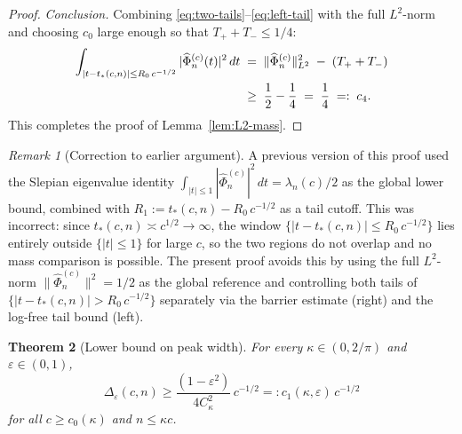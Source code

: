\documentclass[12pt,a4paper]{amsart}
\newtheorem{theorem}{Theorem}[section]
\theoremstyle{definition}
\theoremstyle{remark}
\newtheorem{remark}[theorem]{Remark}
\newcommand{\Phihat}{\widehat{\Phi}}
\newcommand{\tstar}{t_*(c,n)}
\begin{document}
\begin{proof}
\textit{Conclusion.}
Combining \eqref{eq:two-tails}--\eqref{eq:left-tail}
with the full $L^2$-norm and choosing $c_0$ large enough
so that $T_+ + T_- \le 1/4$:
\begin{align}
  \int_{|t-\tstar|\le R_0\,c^{-1/2}}
  |\Phihat_n^{(c)}(t)|^2\,dt
  &\;=\;
  \|\Phihat_n^{(c)}\|_{L^2}^2
  \;-\; (T_+ + T_-)
  \notag\\
  &\;\ge\;
  \frac{1}{2} - \frac{1}{4}
  \;=\;
  \frac{1}{4}
  \;=:\; c_4.
  \label{eq:step5-final}
\end{align}
This completes the proof of Lemma~\ref{lem:L2-mass}.
\end{proof}

\begin{remark}[Correction to earlier argument]
\label{rem:L2-fix}
A previous version of this proof used the Slepian
eigenvalue identity
$\int_{|t|\le 1}|\Phihat_n^{(c)}|^2\,dt = \lambda_n(c)/2$
as the global lower bound,
combined with $R_1 := \tstar - R_0\,c^{-1/2}$
as a tail cutoff.
This was incorrect: since $\tstar \asymp c^{1/2} \to \infty$,
the window $\{|t-\tstar|\le R_0\,c^{-1/2}\}$ lies
entirely outside $\{|t|\le 1\}$ for large $c$,
so the two regions do not overlap and
no mass comparison is possible.
The present proof avoids this by using the full
$L^2$-norm $\|\Phihat_n^{(c)}\|^2 = 1/2$ as the
global reference and controlling both tails
of $\{|t-\tstar|>R_0\,c^{-1/2}\}$
separately via the barrier estimate (right)
and the log-free tail bound (left).
\end{remark}


\begin{theorem}[Lower bound on peak width]
\label{thm:lower}
For every $\kappa\in(0,2/\pi)$ and $\varepsilon\in(0,1)$,
\[
  \Delta_\varepsilon(c,n)
  \ge
  \frac{(1-\varepsilon^2)}{4C_\kappa^2}\,c^{-1/2}
  =: c_1(\kappa,\varepsilon)\,c^{-1/2}
\]
for all $c\ge c_0(\kappa)$ and $n\le\kappa c$.
\end{theorem}
\end{document}
